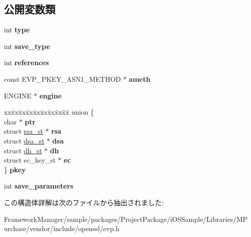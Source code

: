 \subsection*{公開変数類}
\begin{DoxyCompactItemize}
\item 
\hypertarget{structevp__pkey__st_a7d550d554ff45db26681e2d2e2f23b66}{}int {\bfseries type}\label{structevp__pkey__st_a7d550d554ff45db26681e2d2e2f23b66}

\item 
\hypertarget{structevp__pkey__st_a0bbebdbdbba1e1f9c796c1e4a3a2eb04}{}int {\bfseries save\+\_\+type}\label{structevp__pkey__st_a0bbebdbdbba1e1f9c796c1e4a3a2eb04}

\item 
\hypertarget{structevp__pkey__st_a89b11b788ffad7d747d1c7eed4cf279f}{}int {\bfseries references}\label{structevp__pkey__st_a89b11b788ffad7d747d1c7eed4cf279f}

\item 
\hypertarget{structevp__pkey__st_a89d9cab6071d889719126a8ebc03b673}{}const E\+V\+P\+\_\+\+P\+K\+E\+Y\+\_\+\+A\+S\+N1\+\_\+\+M\+E\+T\+H\+O\+D $\ast$ {\bfseries ameth}\label{structevp__pkey__st_a89d9cab6071d889719126a8ebc03b673}

\item 
\hypertarget{structevp__pkey__st_a1fa3baf8af4a6f09233be9db77623e30}{}E\+N\+G\+I\+N\+E $\ast$ {\bfseries engine}\label{structevp__pkey__st_a1fa3baf8af4a6f09233be9db77623e30}

\item 
\hypertarget{structevp__pkey__st_a387c762b126648789066204fc4c1bde8}{}\begin{tabbing}
xx\=xx\=xx\=xx\=xx\=xx\=xx\=xx\=xx\=\kill
union \{\\
\>char $\ast$ {\bfseries ptr}\\
\>struct \hyperlink{structrsa__st}{rsa\_st} $\ast$ {\bfseries rsa}\\
\>struct \hyperlink{structdsa__st}{dsa\_st} $\ast$ {\bfseries dsa}\\
\>struct \hyperlink{structdh__st}{dh\_st} $\ast$ {\bfseries dh}\\
\>struct ec\_key\_st $\ast$ {\bfseries ec}\\
\} {\bfseries pkey}\label{structevp__pkey__st_a387c762b126648789066204fc4c1bde8}
\\

\end{tabbing}\item 
\hypertarget{structevp__pkey__st_a5ce6533b78cc5e5814a60ca2403c3108}{}int {\bfseries save\+\_\+parameters}\label{structevp__pkey__st_a5ce6533b78cc5e5814a60ca2403c3108}

\end{DoxyCompactItemize}


この構造体詳解は次のファイルから抽出されました\+:\begin{DoxyCompactItemize}
\item 
Framework\+Manager/sample/packages/\+Project\+Package/i\+O\+S\+Sample/\+Libraries/\+M\+Purchase/vendor/include/openssl/evp.\+h\end{DoxyCompactItemize}
